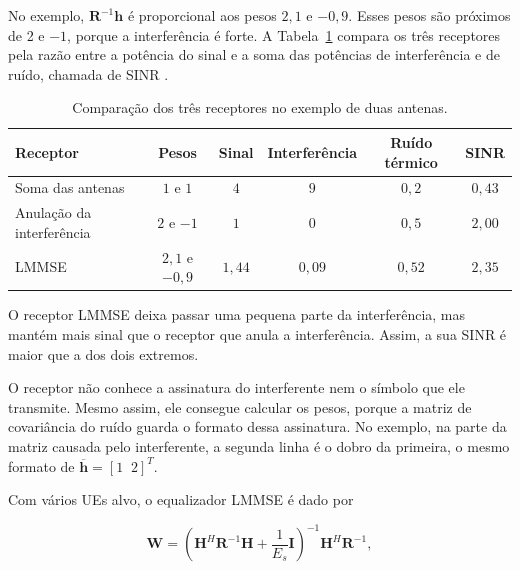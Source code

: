 No exemplo, $\mathbf{R}^{-1}\mathbf{h}$ é proporcional aos pesos $2{,}1$ e $-0{,}9$. Esses pesos são próximos de 2 e $-1$, porque a interferência é forte. A Tabela~\ref{tab:comparacao_receptores} compara os três receptores pela razão entre a potência do sinal e a soma das potências de interferência e de ruído, chamada de SINR \cite[p.~358]{tse-viswanath}.

\begin{table}[htbp]
\caption{Comparação dos três receptores no exemplo de duas antenas.}
\label{tab:comparacao_receptores}
\centering
\begin{tabular}{lccccc}
\hline
Receptor & Pesos & Sinal & Interferência & Ruído térmico & SINR \\
\hline
Soma das antenas & $1$ e $1$ & $4$ & $9$ & $0{,}2$ & $0{,}43$ \\
Anulação da interferência & $2$ e $-1$ & $1$ & $0$ & $0{,}5$ & $2{,}00$ \\
LMMSE & $2{,}1$ e $-0{,}9$ & $1{,}44$ & $0{,}09$ & $0{,}52$ & $2{,}35$ \\
\hline
\end{tabular}
\end{table}

O receptor LMMSE deixa passar uma pequena parte da interferência, mas mantém mais sinal que o receptor que anula a interferência. Assim, a sua SINR é maior que a dos dois extremos.



O receptor não conhece a assinatura do interferente nem o símbolo que ele transmite. Mesmo assim, ele consegue calcular os pesos, porque a matriz de covariância do ruído guarda o formato dessa assinatura. No exemplo, na parte da matriz causada pelo interferente, a segunda linha é o dobro da primeira, o mesmo formato de $\overline{\mathbf{h}}=[1\;\;2]^T$.

Com vários UEs alvo, o equalizador LMMSE é dado por

$$
\mathbf{W}=\left(\mathbf{H}^H\mathbf{R}^{-1}\mathbf{H}+\frac{1}{E_s}\mathbf{I}\right)^{-1}\mathbf{H}^H\mathbf{R}^{-1},
$$


